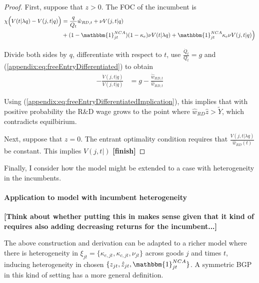 \documentclass[11pt,english]{article}
\theoremstyle{definition}
\begin{document}
\begin{proof}
	
	
	
	First, suppose that $z > 0$. The FOC of the incumbent is
	\begin{align}
		\chi \Big( V(t|\lambda q) - V(j,t|q) \Big) &= \frac{q}{Q_t} \hat{w}_{RD,t} + \nu V(j,t|q) \nonumber \\
		&+ (1 - \mathbbm{1}^{NCA}_{jt}) (1- \kappa_e) \nu V(t|\lambda q) + \mathbbm{1}^{NCA}_{jt}  \kappa_c \nu V(j,t|q) \Big) 
	\end{align}
	
	Divide both sides by $q$, differentiate with respect to $t$, use $\frac{\dot{Q}_t}{Q_t} = g$ and  (\ref{appendix:eq:freeEntryDifferentiated}) to obtain
	\begin{align}
		-\frac{\dot{V}(j,t|q)}{V(j,t|q)} &= g - \frac{\dot{\hat{w}}_{RD,t}}{\hat{w}_{RD,t}}  \label{appendix:eq:freeEntryDifferentiatedImplication}
	\end{align}
	
	Using (\ref{appendix:eq:freeEntryDifferentiatedImplication}), this implies that with positive probability the R\&D wage grows to the point where $\hat{w}_{RD} \hat{z} > \tilde{Y}$, which contradicts equilbirium.
	
	Next, suppose that $z = 0$. The entrant optimality condition requires that $\frac{V(j,t|\lambda q)}{\hat{w}_{RD}(t)}$ be constant. This implies $V(j,t|) $ \textbf{[finish]}
	
	
	
	
\end{proof}

Finally, I consider how the model might be extended to a case with heterogeneity in the incumbents. 

\paragraph{Application to model with incumbent heterogeneity}\label{appendix:model:heterogeneity}

\textbf{[Think about whether putting this in makes sense given that it kind of requires also adding decreasing returns for the incumbent...]}

The above construction and derivation can be adapted to a richer model where there is heterogeneity in $\xi_{jt} = \{\kappa_{e,jt}, \kappa_{c,jt}, \nu_{jt}\}$ across goods $j$ and times $t$, inducing heterogeneity in chosen $\{z_{jt}, \hat{z}_{jt}, \mathbbm{1}^{NCA}_{jt}\}$. A symmetric BGP in this kind of setting has a more general definition.
\end{document}
